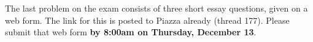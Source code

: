 \documentclass[addpoints]{exam}
\begin{document}
\begin{questions}
		

\vfill


\question[10] The last problem on the exam consists of three short essay questions, given on a web form. The link for this is posted to Piazza already (thread \@177). Please submit that web form \textbf{by 8:00am on Thursday, December 13}. 

	
\end{questions}

		
\end{document}
